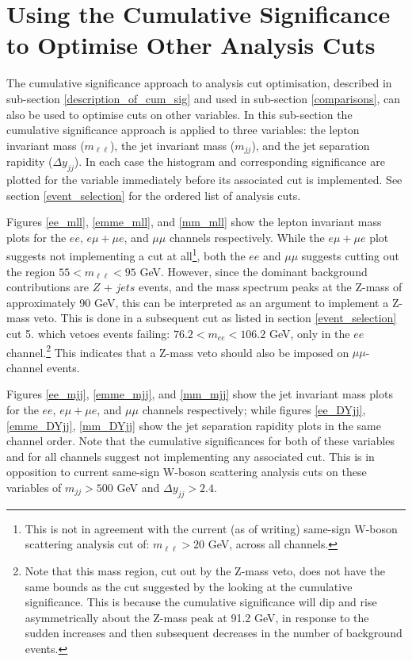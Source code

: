 \section{Using the Cumulative Significance to Optimise Other Analysis Cuts}
The cumulative significance approach to analysis cut optimisation, described in sub-section \ref{description_of_cum_sig} and used in sub-section \ref{comparisons}, can also be used to optimise cuts on other variables. In this sub-section the cumulative significance approach is applied to three variables: the lepton invariant mass ($m_{\ell \ell}$), the jet invariant mass ($m_{jj}$), and the jet separation rapidity ($\Delta y_{jj}$). In each case the histogram and corresponding significance are plotted for the variable immediately before its associated cut is implemented. See section \ref{event_selection} for the ordered list of analysis cuts.

Figures \ref{ee_mll}, \ref{emme_mll}, and \ref{mm_mll} show the lepton invariant mass plots for the $ee$, $e\mu + \mu e$, and $\mu\mu$ channels respectively. While the $e \mu +\mu e$ plot suggests not implementing a cut at all\footnote{This is not in agreement with the current (as of writing) same-sign W-boson scattering analysis cut of: $m_{\ell \ell} > 20$ GeV, across all channels.}, both the $ee$ and $\mu\mu$ suggests cutting out the region $55 < m_{\ell \ell} < 95$ GeV. However, since the dominant background contributions are $Z$ + $jets$ events, and the mass spectrum peaks at the Z-mass of approximately 90 GeV, this can be interpreted as an argument to implement a Z-mass veto. This is done in a subsequent cut as listed in section \ref{event_selection} cut 5. which vetoes events failing: $76.2 < m_{ee} < 106.2$ GeV, only in the $ee$ channel.\footnote{Note that this mass region, cut out by the Z-mass veto, does not have the same bounds as the cut suggested by the looking at the cumulative significance. This is because the cumulative significance will dip and rise asymmetrically about the Z-mass peak at 91.2 GeV, in response to the sudden increases and then subsequent decreases in the number of background events.} This indicates that a Z-mass veto should also be imposed on $\mu\mu$-channel events.

Figures \ref{ee_mjj}, \ref{emme_mjj}, and \ref{mm_mjj} show the jet invariant mass plots for the $ee$, $e\mu + \mu e$, and $\mu\mu$ channels respectively; while figures \ref{ee_DYjj}, \ref{emme_DYjj}, \ref{mm_DYjj} show the jet separation rapidity plots in the same channel order. Note that the cumulative significances for both of these variables and for all channels suggest not implementing any associated cut. This is in opposition to current same-sign W-boson scattering analysis cuts on these variables of $m_{jj} > 500$ GeV and $\Delta y_{jj} > 2.4$.

